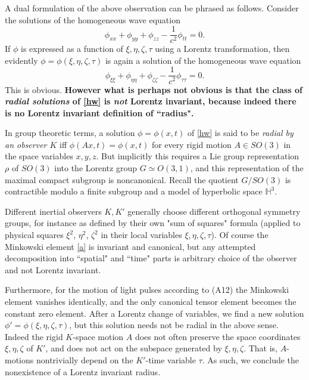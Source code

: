 \documentclass[12pt]{amsart}
\theoremstyle{definition}
\theoremstyle{remark}
\newcommand{\bH}{\mathbb{H}}
\begin{document}
A dual formulation of the above observation can be phrased as follows. Consider the solutions of the homogeneous wave equation 
\begin{equation} \label{hw}
\phi_{xx}+\phi_{yy}+\phi_{zz}-\frac{1}{c^2}\phi_{tt}=0.
\end{equation} 
If $\phi$ is expressed as a function of $\xi, \eta, \zeta, \tau$ using a Lorentz transformation, then evidently $\phi=\phi(\xi, \eta, \zeta, \tau)$ is again a solution of the homogeneous wave equation $$\phi_{\xi \xi}+\phi_{\eta \eta}+\phi_{\zeta \zeta}-\frac{1}{c^2}\phi_{\tau \tau}=0.$$ This is obvious. \textbf{However what is perhaps not obvious is that the class of \emph{radial solutions} of \eqref{hw} is \emph{not} Lorentz invariant, because indeed there is no Lorentz invariant definition of ``radius".} 

In group theoretic terms, a solution $\phi=\phi(x,t)$ of \eqref{hw} is said to be \emph{radial by an observer $K$} iff $\phi(Ax,t)=\phi(x,t)$ for every rigid motion $A\in SO(3)$ in the space variables $x,y,z$. But implicitly this requires a Lie group representation $\rho$ of $SO(3)$ into the Lorentz group $G\simeq O(3,1)$, and this representation of the maximal compact subgroup is noncanonical. Recall the quotient $G/SO(3)$ is contractible modulo a finite subgroup and a model of hyperbolic space $\bH^3$. 

Different inertial observers $K, K'$ generally choose different orthogonal symmetry groups, for instance as defined by their own "sum of squares" formula (applied to physical squares $\xi^2$, $\eta^2$, $\zeta^2$ in their local variables $\xi, \eta, \zeta, \tau$). Of course the Minkowski element \eqref{a} is invariant and canonical, but any attempted decomposition into ``spatial" and ``time" parts is arbitrary choice of the observer and not Lorentz invariant. 

Furthermore, for the motion of light pulses according to (A12) the Minkowski element vanishes identically, and the only canonical tensor element becomes the constant zero element. After a Lorentz change of variables, we find a new solution $\phi'=\phi(\xi, \eta, \zeta, \tau)$, but this solution needs not be radial in the above sense. Indeed the rigid $K$-space motion $A$ does not often preserve the space coordinates $\xi, \eta, \zeta$ of $K'$, and does not act on the subspace generated by $\xi, \eta, \zeta$. That is, $A$-motions nontrivially depend on the $K'$-time variable $\tau$.
As such, we conclude the nonexistence of a Lorentz invariant radius.
\end{document}
